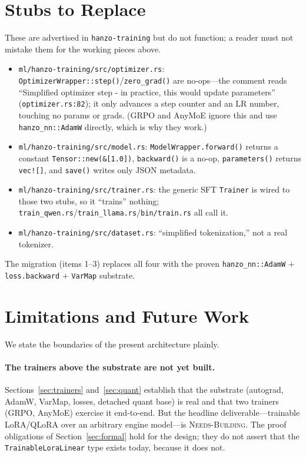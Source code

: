 \documentclass[11pt]{article}
\begin{document}
\section{Stubs to Replace}
\label{sec:stubs}

These are advertised in \texttt{hanzo-training} but do not function; a reader must not mistake them for the working pieces above.

\begin{itemize}
    \item \texttt{ml/hanzo-training/src/optimizer.rs}: \texttt{OptimizerWrapper::step()}/\texttt{zero\_grad()} are no-ops---the comment reads ``Simplified optimizer step - in practice, this would update parameters'' (\texttt{optimizer.rs:82}); it only advances a step counter and an LR number, touching no params or grads. (GRPO and AnyMoE ignore this and use \texttt{hanzo\_nn::AdamW} directly, which is why they work.)
    \item \texttt{ml/hanzo-training/src/model.rs}: \texttt{ModelWrapper.forward()} returns a constant \texttt{Tensor::new(\&[1.0])}, \texttt{backward()} is a no-op, \texttt{parameters()} returns \texttt{vec![]}, and \texttt{save()} writes only JSON metadata.
    \item \texttt{ml/hanzo-training/src/trainer.rs}: the generic SFT \texttt{Trainer} is wired to those two stubs, so it ``trains'' nothing; \texttt{train\_qwen.rs}/\texttt{train\_llama.rs}/\texttt{bin/train.rs} all call it.
    \item \texttt{ml/hanzo-training/src/dataset.rs}: ``simplified tokenization,'' not a real tokenizer.
\end{itemize}

The migration (items 1--3) replaces all four with the proven \texttt{hanzo\_nn::AdamW} $+$ \texttt{loss.backward} $+$ \texttt{VarMap} substrate.

\section{Limitations and Future Work}
\label{sec:limitations}

We state the boundaries of the present architecture plainly.

\paragraph{The trainers above the substrate are not yet built.} Sections~\ref{sec:trainers} and~\ref{sec:quant} establish that the substrate (autograd, AdamW, VarMap, losses, detached quant base) is real and that two trainers (GRPO, AnyMoE) exercise it end-to-end. But the headline deliverable---trainable LoRA/QLoRA over an arbitrary engine model---is \textsc{Needs-Building}. The proof obligations of Section~\ref{sec:formal} hold for the design; they do not assert that the \texttt{TrainableLoraLinear} type exists today, because it does not.
\end{document}
